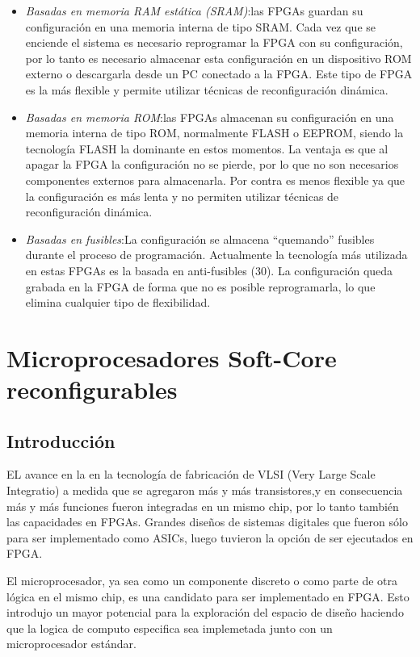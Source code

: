 \begin {itemize}
\item  
\textit {Basadas en memoria RAM estática (SRAM)}:las FPGAs guardan su configuración en una memoria interna de tipo SRAM. Cada vez que se enciende el sistema es necesario reprogramar la FPGA con su configuración, por lo tanto es necesario almacenar esta configuración en un dispositivo ROM externo o descargarla desde un PC conectado a la FPGA. Este tipo de FPGA es la más flexible y permite utilizar técnicas de reconfiguración dinámica.
\item  
\textit{Basadas en memoria ROM}:las FPGAs almacenan su configuración en una memoria interna de tipo ROM, normalmente FLASH o EEPROM, siendo la tecnología FLASH la dominante en estos momentos. La ventaja es que al apagar la FPGA la configuración no se pierde, por lo que no son necesarios componentes externos para almacenarla. Por contra es menos flexible ya que la configuración es más lenta y no permiten utilizar técnicas de reconfiguración dinámica.
\item  
\textit{Basadas en fusibles}:La configuración se almacena “quemando” fusibles durante el proceso de programación. Actualmente la tecnología más utilizada en estas FPGAs es la basada en anti-fusibles (30). La configuración queda grabada en la FPGA de forma que no es posible reprogramarla, lo que elimina cualquier tipo de flexibilidad.
 \end {itemize}


\section{Microprocesadores Soft-Core reconfigurables}

 \subsection{Introducción}

EL avance en la en la tecnología de fabricación de VLSI (Very Large Scale Integratio) a medida que se agregaron más y más transistores,y en consecuencia más y más funciones fueron integradas en un mismo chip, por lo tanto también las capacidades en FPGAs. Grandes diseños de sistemas digitales que fueron sólo para ser implementado como ASICs, luego tuvieron la opción de ser ejecutados en FPGA.

El microprocesador, ya sea como un componente discreto o  como parte de otra lógica en el mismo chip, es una candidato  para ser  implementado en FPGA. Esto introdujo un mayor potencial para la exploración del espacio de diseño haciendo que la logica de computo especifica sea implemetada junto con un microprocesador estándar. \cite{Etiqueta05}

